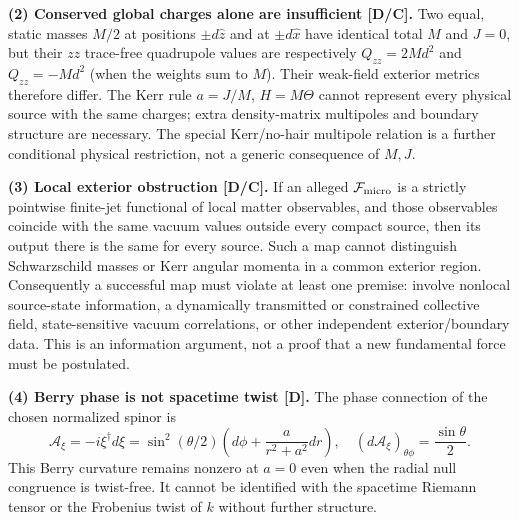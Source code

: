 \documentclass[11pt,a4paper]{article}
\begin{document}
\textbf{(2) Conserved global charges alone are insufficient [D/C].} Two equal, static masses $M/2$ at positions $\pm d\hat z$ and at $\pm d\hat x$ have identical total $M$ and $J=0$, but their $zz$ trace-free quadrupole values are respectively $Q_{zz}=2Md^2$ and $Q_{zz}=-Md^2$ (when the weights sum to $M$). Their weak-field exterior metrics therefore differ. The Kerr rule $a=J/M$, $H=M\Theta$ cannot represent every physical source with the same charges; extra density-matrix multipoles and boundary structure are necessary. The special Kerr/no-hair multipole relation is a further conditional physical restriction, not a generic consequence of $M,J$.

\textbf{(3) Local exterior obstruction [D/C].} If an alleged $\mathcal F_{\rm micro}$ is a strictly pointwise finite-jet functional of local matter observables, and those observables coincide with the same vacuum values outside every compact source, then its output there is the same for every source. Such a map cannot distinguish Schwarzschild masses or Kerr angular momenta in a common exterior region. Consequently a successful map must violate at least one premise: involve nonlocal source-state information, a dynamically transmitted or constrained collective field, state-sensitive vacuum correlations, or other independent exterior/boundary data. This is an information argument, not a proof that a new fundamental force must be postulated.

\textbf{(4) Berry phase is not spacetime twist [D].} The phase connection of the chosen normalized spinor is
\begin{equation}\label{eq:v12-Berry}
\mathcal A_\xi=-i\xi^\dagger d\xi
=\sin^2(\theta/2)\left(d\phi+\frac{a}{r^2+a^2}dr\right),\quad
(d\mathcal A_\xi)_{\theta\phi}=\frac{\sin\theta}{2}.
\end{equation}
This Berry curvature remains nonzero at $a=0$ even when the radial null congruence is twist-free. It cannot be identified with the spacetime Riemann tensor or the Frobenius twist of $k$ without further structure.
\end{document}
